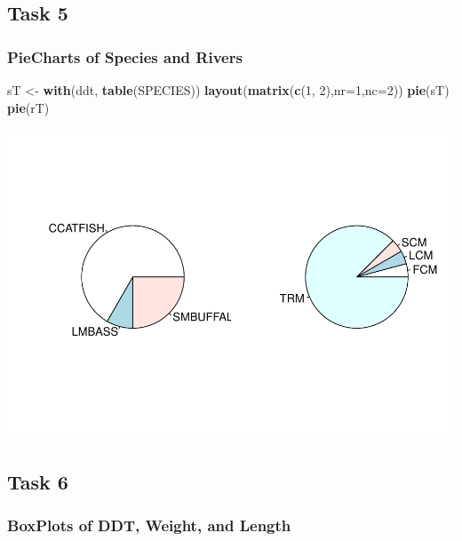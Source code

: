 \documentclass[]{article}
\newenvironment{Shaded}{\begin{snugshade}}{\end{snugshade}}
\newcommand{\KeywordTok}[1]{\textcolor[rgb]{0.13,0.29,0.53}{\textbf{#1}}}
\newcommand{\DataTypeTok}[1]{\textcolor[rgb]{0.13,0.29,0.53}{#1}}
\newcommand{\DecValTok}[1]{\textcolor[rgb]{0.00,0.00,0.81}{#1}}
\newcommand{\StringTok}[1]{\textcolor[rgb]{0.31,0.60,0.02}{#1}}
\newcommand{\NormalTok}[1]{#1}
\begin{document}
\subsection{Task 5}\label{task-5}

\subsubsection{PieCharts of Species and
Rivers}\label{piecharts-of-species-and-rivers}

\begin{Shaded}
\begin{Highlighting}[]
\NormalTok{sT <-}\StringTok{ }\KeywordTok{with}\NormalTok{(ddt, }\KeywordTok{table}\NormalTok{(SPECIES))}
\KeywordTok{layout}\NormalTok{(}\KeywordTok{matrix}\NormalTok{(}\KeywordTok{c}\NormalTok{(}\DecValTok{1}\NormalTok{, }\DecValTok{2}\NormalTok{),}\DataTypeTok{nr=}\DecValTok{1}\NormalTok{,}\DataTypeTok{nc=}\DecValTok{2}\NormalTok{))}
\KeywordTok{pie}\NormalTok{(sT)}
\KeywordTok{pie}\NormalTok{(rT)}
\end{Highlighting}
\end{Shaded}

\includegraphics{./tex2pdf.8500/326cf2f84c38d68d6f6073cd225aaa2e488337a8.pdf}

\subsection{Task 6}\label{task-6}

\subsubsection{BoxPlots of DDT, Weight, and
Length}\label{boxplots-of-ddt-weight-and-length}
\end{document}
